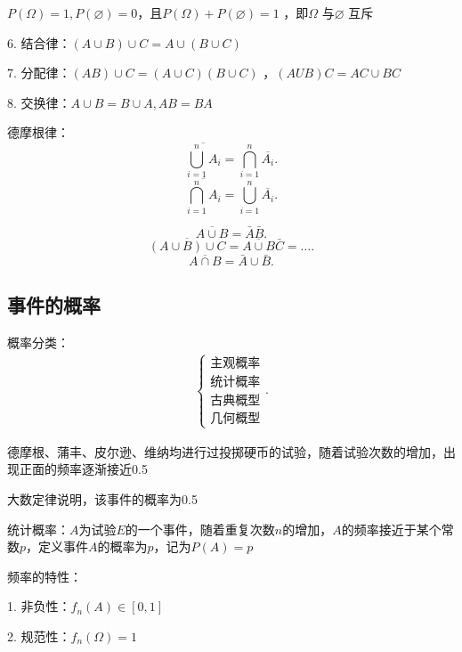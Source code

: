 \begin{notation}
    $P\left( \Omega \right) =1,P\left( \varnothing \right) =0$，且$P\left( \Omega \right) +P\left( \varnothing \right) =1$ ，即$\Omega$ 与$\varnothing$ 互斥
\end{notation}

6. 结合律：$\left( A\cup B \right) \cup C = A\cup \left( B\cup C \right) $

7. 分配律：$\left( AB \right) \cup C=\left( A\cup C \right) \left( B\cup C \right) $ ，$\left( AUB \right) C =AC\cup BC$

8. 交换律：$A\cup B=B\cup A,AB=BA$
\begin{notation}
    德摩根律：\[
    \overline{\bigcup_{i=1}^{n}A_i} = \bigcap_{i=1}^{n}\overline{A_i}
    .\] 
    \[
        \overline{\bigcap_{i=1}^{n}A_i}=\bigcup_{i=1}^{n}\overline{A_i}
    .\] 
\end{notation}
\begin{eg}
     \[
        \overline{A\cup B}=\bar{A}\bar{B}
    .\]
    \[
        \overline{\left( A\cup B \right) \cup C} = \overline{A\cup B}\bar{C}=\ldots
    .\] 
    \[
        \overline{A\cap B}=\bar{A}\cup \bar{B}
    .\] 
\end{eg}
\subsection{事件的概率}%
\label{sub:事件的概率}
概率分类：
\begin{align*}
    \begin{cases}
        \text{主观概率}\\ 
        \text{统计概率}\\
        \text{古典概型}\\
        \text{几何概型}
    \end{cases}
.\end{align*}
\begin{notation}
    德摩根、蒲丰、皮尔逊、维纳均进行过投掷硬币的试验，随着试验次数的增加，出现正面的频率逐渐接近0.5

    大数定律说明，该事件的概率为0.5
\end{notation}
\begin{defi}
    统计概率：$A$为试验$E$的一个事件，随着重复次数$n$的增加，$A$的频率接近于某个常数$p$，定义事件$A$的概率为$p$，记为$P\left( A \right) =p$
\end{defi}
频率的特性：

1. 非负性：$f_n\left( A \right) \in \left[ 0,1 \right] $

2. 规范性：$f_n\left( \Omega \right) =1$

